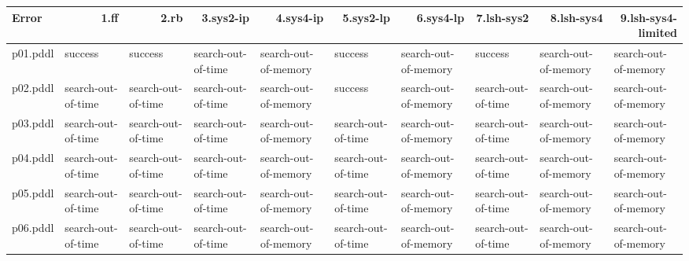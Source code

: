 \documentclass{article}
\begin{document}
\begin{tabular}{@{}lrrrrrrrrr@{}}
Error & 1.ff & 2.rb & 3.sys2-ip & 4.sys4-ip & 5.sys2-lp & 6.sys4-lp & 7.lsh-sys2 & 8.lsh-sys4 & 9.lsh-sys4-limited \\
\midrule
p01.pddl & \multicolumn{1}{|l|}{success} & \multicolumn{1}{|l|}{success} & \multicolumn{1}{|l|}{search-out-of-time} & \multicolumn{1}{|l|}{search-out-of-memory} & \multicolumn{1}{|l|}{success} & \multicolumn{1}{|l|}{search-out-of-memory} & \multicolumn{1}{|l|}{success} & \multicolumn{1}{|l|}{search-out-of-memory} & \multicolumn{1}{|l|}{search-out-of-memory} \\
p02.pddl & \multicolumn{1}{|l|}{search-out-of-time} & \multicolumn{1}{|l|}{search-out-of-time} & \multicolumn{1}{|l|}{search-out-of-time} & \multicolumn{1}{|l|}{search-out-of-memory} & \multicolumn{1}{|l|}{success} & \multicolumn{1}{|l|}{search-out-of-memory} & \multicolumn{1}{|l|}{search-out-of-time} & \multicolumn{1}{|l|}{search-out-of-memory} & \multicolumn{1}{|l|}{search-out-of-memory} \\
p03.pddl & \multicolumn{1}{|l|}{search-out-of-time} & \multicolumn{1}{|l|}{search-out-of-time} & \multicolumn{1}{|l|}{search-out-of-time} & \multicolumn{1}{|l|}{search-out-of-memory} & \multicolumn{1}{|l|}{search-out-of-time} & \multicolumn{1}{|l|}{search-out-of-memory} & \multicolumn{1}{|l|}{search-out-of-time} & \multicolumn{1}{|l|}{search-out-of-memory} & \multicolumn{1}{|l|}{search-out-of-memory} \\
p04.pddl & \multicolumn{1}{|l|}{search-out-of-time} & \multicolumn{1}{|l|}{search-out-of-time} & \multicolumn{1}{|l|}{search-out-of-time} & \multicolumn{1}{|l|}{search-out-of-memory} & \multicolumn{1}{|l|}{search-out-of-time} & \multicolumn{1}{|l|}{search-out-of-memory} & \multicolumn{1}{|l|}{search-out-of-time} & \multicolumn{1}{|l|}{search-out-of-memory} & \multicolumn{1}{|l|}{search-out-of-memory} \\
p05.pddl & \multicolumn{1}{|l|}{search-out-of-time} & \multicolumn{1}{|l|}{search-out-of-time} & \multicolumn{1}{|l|}{search-out-of-time} & \multicolumn{1}{|l|}{search-out-of-memory} & \multicolumn{1}{|l|}{search-out-of-time} & \multicolumn{1}{|l|}{search-out-of-memory} & \multicolumn{1}{|l|}{search-out-of-time} & \multicolumn{1}{|l|}{search-out-of-memory} & \multicolumn{1}{|l|}{search-out-of-memory} \\
p06.pddl & \multicolumn{1}{|l|}{search-out-of-time} & \multicolumn{1}{|l|}{search-out-of-time} & \multicolumn{1}{|l|}{search-out-of-time} & \multicolumn{1}{|l|}{search-out-of-memory} & \multicolumn{1}{|l|}{search-out-of-time} & \multicolumn{1}{|l|}{search-out-of-memory} & \multicolumn{1}{|l|}{search-out-of-time} & \multicolumn{1}{|l|}{search-out-of-memory} & \multicolumn{1}{|l|}{search-out-of-memory} \\

\end{tabular}
\end{document}
